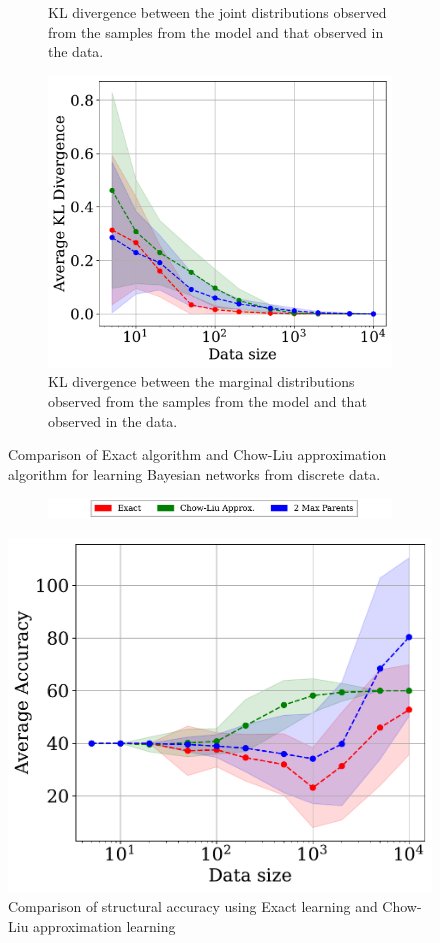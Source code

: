 \begin{figure}[htp!]
\begin{subfigure}{0.32\textwidth}
         \caption{KL divergence between the joint distributions observed from the samples from the model and that observed in the data.}
         \label{fig:kl_div_joint}
     \end{subfigure}
     \hfill
     \begin{subfigure}{0.32\textwidth}
         \centering
         \includegraphics[width=\textwidth]{plots/marginals_kl_divergence.pdf}
         \caption{KL divergence between the marginal distributions observed from the samples from the model and that observed in the data.}
         \label{fig:kl_div_marginals}
     \end{subfigure}
        \caption{Comparison of Exact algorithm and Chow-Liu approximation algorithm for learning Bayesian networks from discrete data.}
        \label{fig:str_learning_comp}
\end{figure}

\begin{figure}[htp!]
\begin{subfigure}{0.7\textwidth}
         \centering
    \includegraphics[width=\textwidth]{plots/legends.pdf}
     \end{subfigure}
    \centering
    \includegraphics[width=0.5\linewidth]{plots/accuracy.pdf}
    \caption{Comparison of structural accuracy using Exact learning and Chow-Liu approximation learning}
    \label{fig:str_acc}
\end{figure}

